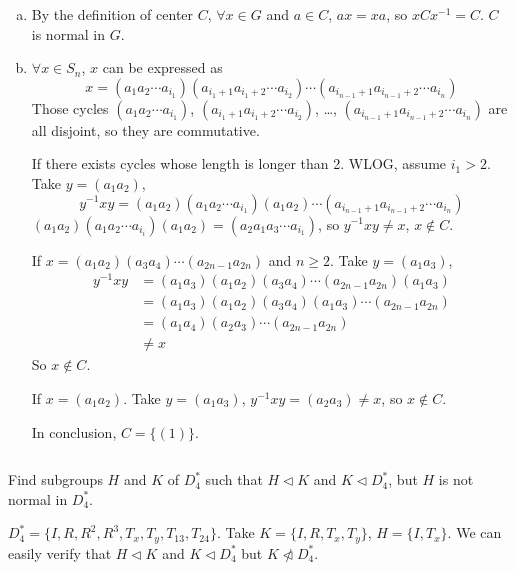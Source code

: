 \begin{answer}
    \begin{enumerate}[(a)]
        \item By the definition of center $C$, $\forall x\in G$ and $a\in C$, $ax=xa$, so $xCx^{-1}=C$. $C$ is normal in $G$.
        \item $\forall x\in S_{n}$, $x$ can be expressed as \[x=(a_{1}a_{2}\cdots a_{i_{1}})(a_{i_{1}+1}a_{i_{1}+2}\cdots a_{i_{2}})\cdots(a_{i_{n-1}+1}a_{i_{n-1}+2}\cdots a_{i_{n}})\]
        Those cycles $(a_{1}a_{2}\cdots a_{i_{1}})$, $(a_{i_{1}+1}a_{i_{1}+2}\cdots a_{i_{2}})$, \dots, $(a_{i_{n-1}+1}a_{i_{n-1}+2}\cdots a_{i_{n}})$ are all disjoint, so they are commutative.

        If there exists cycles whose length is longer than 2. WLOG, assume $i_{1}>2$. Take $y=(a_{1}a_{2})$, \[y^{-1}xy=(a_{1}a_{2})(a_{1}a_{2}\cdots a_{i_{1}})(a_{1}a_{2})\cdots(a_{i_{n-1}+1}a_{i_{n-1}+2}\cdots a_{i_{n}})\] $(a_{1}a_{2})(a_{1}a_{2}\cdots a_{i_{i}})(a_{1}a_{2})=(a_{2}a_{1}a_{3}\cdots a_{i_{1}})$, so $y^{-1}xy\neq x$, $x\notin C$. 

        If $x=(a_{1}a_{2})(a_{3}a_{4})\cdots(a_{2n-1}a_{2n})$ and $n\geq 2$. Take $y=(a_{1}a_{3})$, \[\begin{aligned}
            y^{-1}xy&=(a_{1}a_{3})(a_{1}a_{2})(a_{3}a_{4})\cdots(a_{2n-1}a_{2n})(a_{1}a_{3})\\&=(a_{1}a_{3})(a_{1}a_{2})(a_{3}a_{4})(a_{1}a_{3})\cdots(a_{2n-1}a_{2n})\\&=(a_{1}a_{4})(a_{2}a_{3})\cdots(a_{2n-1}a_{2n})\\&\neq x
        \end{aligned}\] So $x\notin C$.

        If $x=(a_{1}a_{2})$. Take $y=(a_{1}a_{3})$, $y^{-1}xy=(a_{2}a_{3})\neq x$, so $x\notin C$.

        In conclusion, $C=\{(1)\}$.
    \end{enumerate}
\end{answer}

$$ $$

\begin{ex}
    Find subgroups $H$ and $K$ of $D_{4}^{*}$ such that $H\lhd K$ and $K\lhd D_{4}^{*}$, but $H$ is not normal in $D_{4}^{*}$.
\end{ex}

\begin{answer}
    $D_{4}^{*}=\{I,R,R^{2},R^{3},T_{x},T_{y},T_{13},T_{24}\}$. Take $K=\{I, R, T_{x}, T_{y}\}$, $H=\{I, T_{x}\}$. We can easily verify that $H\lhd K$ and $K\lhd  D_{4}^{*}$ but $K\ntriangleleft  D_{4}^{*}$.
\end{answer}

